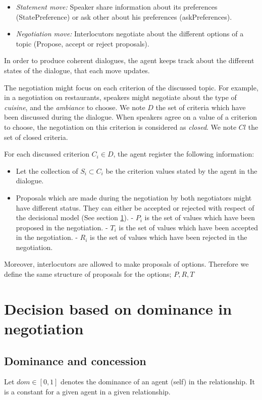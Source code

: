 \documentclass{article}
\begin{document}
		\begin{itemize}
			\item \emph{Statement move:} Speaker share information about its preferences (StatePreference) or ask other about his preferences (askPreferences).
			\item \emph{Negotiation move:} Interlocutors negotiate about the different options of a topic (Propose, accept or reject proposals).
		\end{itemize}
	
	
		 In order to produce coherent dialogues, the agent keeps track about the different states of the dialogue, that each move updates. 
		
		The negotiation might focus on each criterion of the discussed topic. For example, in a negotiation on restaurants, speakers might negotiate about the type of \textit{cuisine}, and the \textit{ambiance} to choose.  We note $D$ the set of criteria which have been discussed during the dialogue. When speakers agree on a value of a criterion to choose, the negotiation on this criterion is considered as \textit{closed}. We note $Cl$ the set of closed criteria.
		
		For each discussed criterion $C_i \in D$, the agent register the following information:		
		\begin{itemize}
			\item Let the collection of $S_i \subset C_i$ be the criterion values stated by the agent in the dialogue.
			\item Proposals which are made during the negotiation by both negotiators might have different status. They can either be accepted or rejected with respect of the decisional model (See section \ref{decision}).
				\subitem - $P_i$ is the set of  values which have been proposed in the negotiation.
				\subitem - $T_i$  is the set of values which have been accepted in the negotiation.
				\subitem - $R_i$  is the set of values which have been rejected in the negotiation.
		\end{itemize}
		
	Moreover, interlocutors are allowed to make proposals of options. Therefore we define the same structure of proposals for the options; $P, R, T$

	\section{Decision based on dominance in negotiation}
	\label{decision}
	\subsection {Dominance and concession}
	Let  $dom \in [0, 1] $ denotes the dominance of an agent (self) in the relationship.  It is a constant for a given agent in a given relationship.
	
\end{document}
